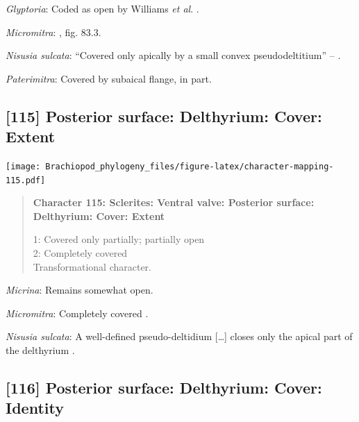 \documentclass[openany]{book}
\begin{document}
\hypertarget{Glyptoria-coding-114}{}
\emph{Glyptoria}: Coded as open by Williams \emph{et al}.
\citeyearpar{Williams1998Thediversity}.

\hypertarget{Micromitra-coding-114}{}
\emph{Micromitra}: \citet{Williams2000LinguliformeaCraniiformea}, fig.
83.3.

\hypertarget{Nisusia_sulcata-coding-114}{}
\emph{Nisusia sulcata}: ``Covered only apically by a small convex
pseudodeltitium'' -- \citet{Holmer2018Evolutionarysignificance}.

\hypertarget{Paterimitra-coding-114}{}
\emph{Paterimitra}: Covered by subaical flange, in part.

\subsection*{{[}115{]} Posterior surface: Delthyrium: Cover:
Extent}\label{posterior-surface-delthyrium-cover-extent}

\texttt{[image: Brachiopod\_phylogeny\_files/figure-latex/character-mapping-115.pdf]}

\begin{quote}
\textbf{Character 115: Sclerites: Ventral valve: Posterior surface:
Delthyrium: Cover: Extent}

1: Covered only partially; partially open\\
2: Completely covered\\
Transformational character.
\end{quote}

\hypertarget{Micrina-coding-115}{}
\emph{Micrina}: Remains somewhat open.

\hypertarget{Micromitra-coding-115}{}
\emph{Micromitra}: Completely covered \citep[fig.
83.3]{Williams2000LinguliformeaCraniiformea}.

\hypertarget{Nisusia_sulcata-coding-115}{}
\emph{Nisusia sulcata}: A well-defined pseudo-deltidium {[}\ldots{}{]}
closes only the apical part of\\
the delthyrium \citep{Rowell1985Theevolutionary}.

\subsection*{{[}116{]} Posterior surface: Delthyrium: Cover:
Identity}\label{posterior-surface-delthyrium-cover-identity}
\end{document}
